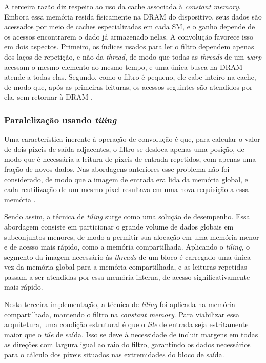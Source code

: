 \documentclass[12pt]{article}
\begin{document}
A terceira razão diz respeito ao uso da cache associada à \emph{constant memory}. Embora essa memória resida fisicamente na DRAM do dispositivo, seus dados são acessados por meio de caches especializadas em cada SM, e o ganho depende de os acessos encontrarem o dado já armazenado nelas. A convolução favorece isso em dois aspectos. Primeiro, os índices usados para ler o filtro dependem apenas dos laços de repetição, e não da \emph{thread}, de modo que todas as \emph{threads} de um \emph{warp} acessam o mesmo elemento ao mesmo tempo, e uma única busca na DRAM atende a todas elas. Segundo, como o filtro é pequeno, ele cabe inteiro na cache, de modo que, após as primeiras leituras, os acessos seguintes são atendidos por ela, sem retornar à DRAM \cite{hwu2023}.

\subsubsection{Paralelização usando \emph{tiling}}

Uma característica inerente à operação de convolução é que, para calcular o valor de dois píxeis de saída adjacentes, o filtro se desloca apenas uma posição, de modo que é necessária a leitura de píxeis de entrada repetidos, com apenas uma fração de novos dados. Nas abordagens anteriores esse problema não foi considerado, de modo que a imagem de entrada era lida da memória global, e cada reutilização de um mesmo pixel resultava em uma nova requisição a essa memória \cite{hwu2023}.

Sendo assim, a técnica de \emph{tiling} surge como uma solução de desempenho. Essa abordagem consiste em particionar o grande volume de dados globais em subconjuntos menores, de modo a permitir sua alocação em uma memória menor e de acesso mais rápido, como a memória compartilhada. Aplicando o \emph{tiling}, o segmento da imagem necessário às \emph{threads} de um bloco é carregado uma única vez da memória global para a memória compartilhada, e as leituras repetidas passam a ser atendidas por essa memória interna, de acesso significativamente mais rápido. 

Nesta terceira implementação, a técnica de \emph{tiling} foi aplicada na memória compartilhada, mantendo o filtro na \emph{constant memory}. Para viabilizar essa arquitetura, uma condição estrutural é que o \emph{tile} de entrada seja estritamente maior que o \emph{tile} de saída. Isso se deve à necessidade de incluir margens em todas as direções com largura igual ao raio do filtro, garantindo os dados necessários para o cálculo dos píxeis situados nas extremidades do bloco de saída.
\end{document}
